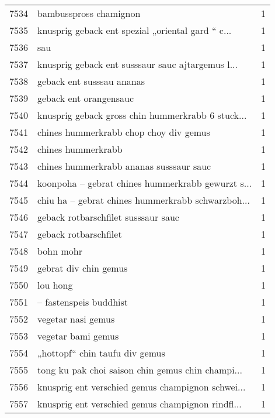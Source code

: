\begin{tabular}{llr}
7534 &                             bambusspross chamignon &      1 \\
7535 &  knusprig geback ent spezial „oriental gard “ c... &      1 \\
7536 &                                                sau &      1 \\
7537 &  knusprig geback ent susssaur sauc ajtargemus l... &      1 \\
7538 &                          geback ent susssau ananas &      1 \\
7539 &                             geback ent orangensauc &      1 \\
7540 &  knusprig geback gross chin hummerkrabb 6 stuck... &      1 \\
7541 &             chines hummerkrabb chop choy div gemus &      1 \\
7542 &                                 chines hummerkrabb &      1 \\
7543 &            chines hummerkrabb ananas susssaur sauc &      1 \\
7544 &  koonpoha – gebrat chines hummerkrabb gewurzt s... &      1 \\
7545 &  chiu ha – gebrat chines hummerkrabb schwarzboh... &      1 \\
7546 &                geback rotbarschfilet susssaur sauc &      1 \\
7547 &                              geback rotbarschfilet &      1 \\
7548 &                                          bohn mohr &      1 \\
7549 &                              gebrat div chin gemus &      1 \\
7550 &                                           lou hong &      1 \\
7551 &                             – fastenspeis buddhist &      1 \\
7552 &                                 vegetar nasi gemus &      1 \\
7553 &                                 vegetar bami gemus &      1 \\
7554 &                     „hottopf“ chin taufu div gemus &      1 \\
7555 &  tong ku pak choi saison chin gemus chin champi... &      1 \\
7556 &  knusprig ent verschied gemus champignon schwei... &      1 \\
7557 &  knusprig ent verschied gemus champignon rindfl... &      1 \\

\end{tabular}
